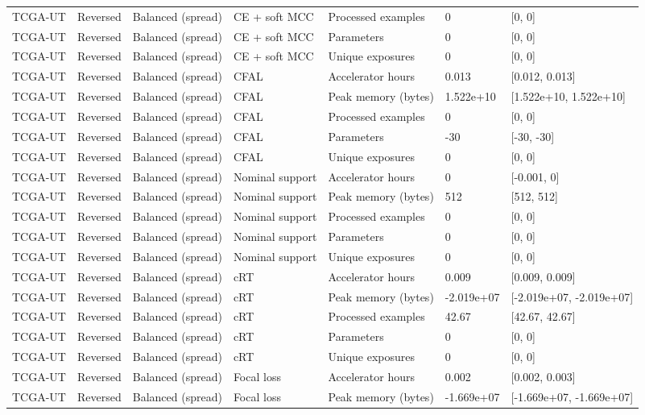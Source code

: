 \begin{longtable}{lllllll}
TCGA-UT & Reversed & Balanced (spread) & CE + soft MCC & Processed examples & 0 & [0, 0] \\
TCGA-UT & Reversed & Balanced (spread) & CE + soft MCC & Parameters & 0 & [0, 0] \\
TCGA-UT & Reversed & Balanced (spread) & CE + soft MCC & Unique exposures & 0 & [0, 0] \\
TCGA-UT & Reversed & Balanced (spread) & CFAL & Accelerator hours & 0.013 & [0.012, 0.013] \\
TCGA-UT & Reversed & Balanced (spread) & CFAL & Peak memory (bytes) & 1.522e+10 & [1.522e+10, 1.522e+10] \\
TCGA-UT & Reversed & Balanced (spread) & CFAL & Processed examples & 0 & [0, 0] \\
TCGA-UT & Reversed & Balanced (spread) & CFAL & Parameters & -30 & [-30, -30] \\
TCGA-UT & Reversed & Balanced (spread) & CFAL & Unique exposures & 0 & [0, 0] \\
TCGA-UT & Reversed & Balanced (spread) & Nominal support & Accelerator hours & 0 & [-0.001, 0] \\
TCGA-UT & Reversed & Balanced (spread) & Nominal support & Peak memory (bytes) & 512 & [512, 512] \\
TCGA-UT & Reversed & Balanced (spread) & Nominal support & Processed examples & 0 & [0, 0] \\
TCGA-UT & Reversed & Balanced (spread) & Nominal support & Parameters & 0 & [0, 0] \\
TCGA-UT & Reversed & Balanced (spread) & Nominal support & Unique exposures & 0 & [0, 0] \\
TCGA-UT & Reversed & Balanced (spread) & cRT & Accelerator hours & 0.009 & [0.009, 0.009] \\
TCGA-UT & Reversed & Balanced (spread) & cRT & Peak memory (bytes) & -2.019e+07 & [-2.019e+07, -2.019e+07] \\
TCGA-UT & Reversed & Balanced (spread) & cRT & Processed examples & 42.67 & [42.67, 42.67] \\
TCGA-UT & Reversed & Balanced (spread) & cRT & Parameters & 0 & [0, 0] \\
TCGA-UT & Reversed & Balanced (spread) & cRT & Unique exposures & 0 & [0, 0] \\
TCGA-UT & Reversed & Balanced (spread) & Focal loss & Accelerator hours & 0.002 & [0.002, 0.003] \\
TCGA-UT & Reversed & Balanced (spread) & Focal loss & Peak memory (bytes) & -1.669e+07 & [-1.669e+07, -1.669e+07] \\

\end{longtable}
